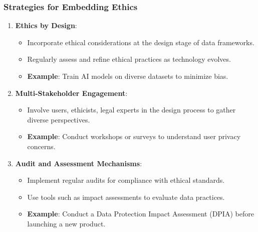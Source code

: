 \documentclass[aspectratio=169]{beamer}
\begin{document}
\begin{frame}[fragile]
    \frametitle{Strategies for Embedding Ethics}
    \begin{enumerate}
        \item \textbf{Ethics by Design}:
            \begin{itemize}
                \item Incorporate ethical considerations at the design stage of data frameworks.
                \item Regularly assess and refine ethical practices as technology evolves.
                \item \textbf{Example}: Train AI models on diverse datasets to minimize bias.
            \end{itemize}
        \item \textbf{Multi-Stakeholder Engagement}:
            \begin{itemize}
                \item Involve users, ethicists, legal experts in the design process to gather diverse perspectives.
                \item \textbf{Example}: Conduct workshops or surveys to understand user privacy concerns.
            \end{itemize}
        \item \textbf{Audit and Assessment Mechanisms}:
            \begin{itemize}
                \item Implement regular audits for compliance with ethical standards.
                \item Use tools such as impact assessments to evaluate data practices.
                \item \textbf{Example}: Conduct a Data Protection Impact Assessment (DPIA) before launching a new product.
            \end{itemize}
    \end{enumerate}
\end{frame}
\end{document}
